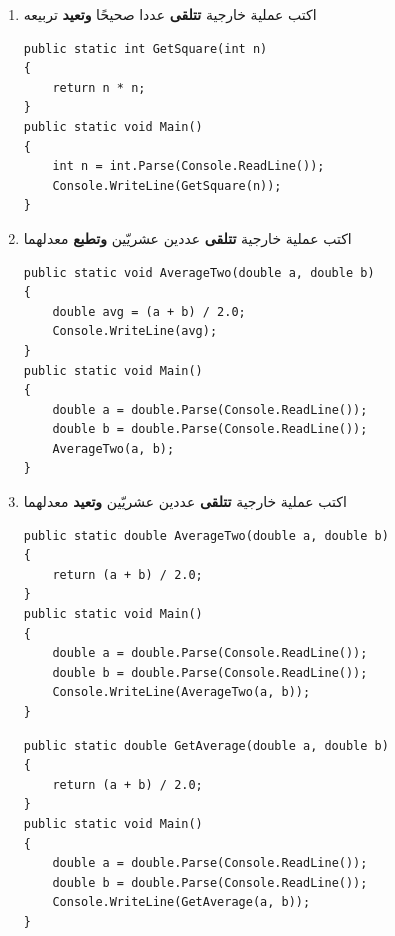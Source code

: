 ﻿\documentclass[12pt]{article}
\begin{document}
\begin{enumerate}[itemsep=3em]
\begin{enumerate}
\item اكتب عملية خارجية \textbf{تتلقى} عددا صحيحًا \textbf{وتعيد} تربيعه
\ifwithsols
\begin{boxSolution}
\begin{english}
\begin{verbatim}
public static int GetSquare(int n)
{
    return n * n;
}
public static void Main()
{
    int n = int.Parse(Console.ReadLine());
    Console.WriteLine(GetSquare(n));
}
\end{verbatim}
\end{english}
\end{boxSolution}
\fi

\item اكتب عملية خارجية \textbf{تتلقى} عددين عشريّين \textbf{وتطبع} معدلهما
\ifwithsols
\begin{boxSolution}
\begin{english}
\begin{verbatim}
public static void AverageTwo(double a, double b)
{
    double avg = (a + b) / 2.0;
    Console.WriteLine(avg);
}
public static void Main()
{
    double a = double.Parse(Console.ReadLine());
    double b = double.Parse(Console.ReadLine());
    AverageTwo(a, b);
}
\end{verbatim}
\end{english}
\end{boxSolution}
\fi

\item اكتب عملية خارجية \textbf{تتلقى} عددين عشريّين \textbf{وتعيد} معدلهما
\ifwithsols
\begin{boxSolution}
\begin{english}
\begin{verbatim}
public static double AverageTwo(double a, double b)
{
    return (a + b) / 2.0;
}
public static void Main()
{
    double a = double.Parse(Console.ReadLine());
    double b = double.Parse(Console.ReadLine());
    Console.WriteLine(AverageTwo(a, b));
}
\end{verbatim}
\end{english}
\end{boxSolution}
\fi


\ifwithsols
\begin{boxSolution}
\begin{english}
\begin{verbatim}
public static double GetAverage(double a, double b)
{
    return (a + b) / 2.0;
}
public static void Main()
{
    double a = double.Parse(Console.ReadLine());
    double b = double.Parse(Console.ReadLine());
    Console.WriteLine(GetAverage(a, b));
}
\end{verbatim}
\end{english}
\end{boxSolution}
\fi


\end{enumerate}
\end{enumerate}
\end{document}
